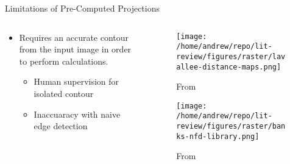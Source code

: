 \documentclass[presentation, aspectratio=1610]{beamer}
\begin{document}
\begin{frame}[label={sec:org9f68fb0}]{Limitations of Pre-Computed Projections}
\begin{columns}
\begin{column}{0.5\columnwidth}
\begin{itemize}
\item Requires an accurate contour from the input image in order to perform calculations.
\begin{itemize}
\item Human supervision for isolated contour
\item Inaccuaracy with naive edge detection
\end{itemize}
\end{itemize}
\end{column}
\begin{column}{0.6\columnwidth}
\begin{figure}[htbp]
\centering
\texttt{[image: /home/andrew/repo/lit-review/figures/raster/lavallee-distance-maps.png]}
\caption{From \autocite{lavalleeRecoveringPositionOrientation1995}}
\end{figure}
\vspace{-0.25in}
\begin{figure}[htbp]
\centering
\texttt{[image: /home/andrew/repo/lit-review/figures/raster/banks-nfd-library.png]}
\caption{From \autocite{banksAccurateMeasurementThreedimensional1996}}
\end{figure}
\end{column}
\end{columns}
\end{frame}
\end{document}
